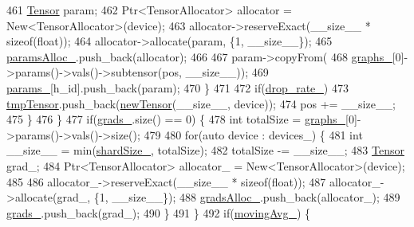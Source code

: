 \begin{DoxyCode}
461             \hyperlink{namespacemarian_a88b71ec34bb354564cddc24eb80f7e14}{Tensor} param;
462             Ptr<TensorAllocator> allocator = New<TensorAllocator>(device);
463             allocator->reserveExact(\_\_size\_\_ * \textcolor{keyword}{sizeof}(\textcolor{keywordtype}{float}));
464             allocator->allocate(param, \{1, \_\_size\_\_\});
465             \hyperlink{classmarian_1_1AsyncGraphGroup_ab881a69415a65b21d9741b6afa2d9f6f}{paramsAlloc\_}.push\_back(allocator);
466 
467             param->copyFrom(
468                 \hyperlink{classmarian_1_1AsyncGraphGroup_a3fbad41763c988a5723a39c2220287d8}{graphs\_}[0]->params()->vals()->subtensor(pos, \_\_size\_\_));
469             \hyperlink{classmarian_1_1AsyncGraphGroup_ad1bf15e55cc12b90d39012303b14767b}{params\_}[h\_id].push\_back(param);
470           \}
471 
472           \textcolor{keywordflow}{if}(\hyperlink{classmarian_1_1AsyncGraphGroup_a774969ba69bab8fbd48e6454bbe7e54c}{drop\_rate\_})
473             \hyperlink{classmarian_1_1AsyncGraphGroup_a5ae977ce219101bcf4166f123bbb8216}{tmpTensor}.push\_back(\hyperlink{classmarian_1_1AsyncGraphGroup_a27115f020b674e27202748d6ab513144}{newTensor}(\_\_size\_\_, device));
474           pos += \_\_size\_\_;
475         \}
476       \}
477       \textcolor{keywordflow}{if}(\hyperlink{classmarian_1_1AsyncGraphGroup_ad2f8bc6900976be4426acc4631d07145}{grads\_}.size() == 0) \{
478         \textcolor{keywordtype}{int} totalSize = \hyperlink{classmarian_1_1AsyncGraphGroup_a3fbad41763c988a5723a39c2220287d8}{graphs\_}[0]->params()->vals()->size();
479 
480         \textcolor{keywordflow}{for}(\textcolor{keyword}{auto} device : devices\_) \{
481           \textcolor{keywordtype}{int} \_\_size\_\_ = min(\hyperlink{classmarian_1_1AsyncGraphGroup_a3af39dcadc6a7f84a4a906f2048fd420}{shardSize\_}, totalSize);
482           totalSize -= \_\_size\_\_;
483           \hyperlink{namespacemarian_a88b71ec34bb354564cddc24eb80f7e14}{Tensor} grad\_;
484           Ptr<TensorAllocator> allocator\_ = New<TensorAllocator>(device);
485 
486           allocator\_->reserveExact(\_\_size\_\_ * \textcolor{keyword}{sizeof}(\textcolor{keywordtype}{float}));
487           allocator\_->allocate(grad\_, \{1, \_\_size\_\_\});
488           \hyperlink{classmarian_1_1AsyncGraphGroup_a0701944b0307c81dd518f57e452f2de6}{gradsAlloc\_}.push\_back(allocator\_);
489           \hyperlink{classmarian_1_1AsyncGraphGroup_ad2f8bc6900976be4426acc4631d07145}{grads\_}.push\_back(grad\_);
490         \}
491       \}
492       \textcolor{keywordflow}{if}(\hyperlink{classmarian_1_1AsyncGraphGroup_a96d6309b1924939d4b77ef1ed3a119d7}{movingAvg\_}) \{

\end{DoxyCode}
